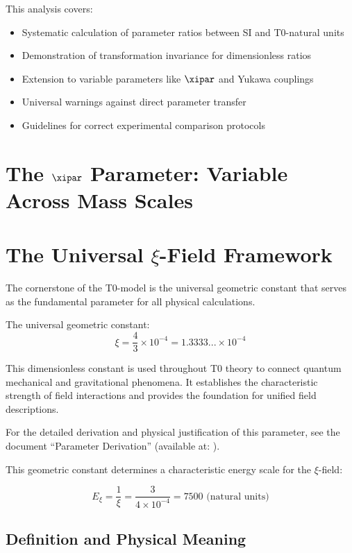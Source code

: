 	This analysis covers:
	\begin{itemize}
		\item Systematic calculation of parameter ratios between SI and T0-natural units
		\item Demonstration of transformation invariance for dimensionless ratios
		\item Extension to variable parameters like $\xipar$ and Yukawa couplings
		\item Universal warnings against direct parameter transfer
		\item Guidelines for correct experimental comparison protocols
	\end{itemize}
	
	\section{The $\xipar$ Parameter: Variable Across Mass Scales}
	\label{sec:xi_parameter}
	\section{The Universal $\xi$-Field Framework}
	
	The cornerstone of the T0-model is the universal geometric constant that serves as the fundamental parameter for all physical calculations.

		The universal geometric constant:
		\begin{equation}
			\xi = \frac{4}{3} \times 10^{-4} = 1.3333... \times 10^{-4}
		\end{equation}

	This dimensionless constant is used throughout T0 theory to connect quantum mechanical and gravitational phenomena. It establishes the characteristic strength of field interactions and provides the foundation for unified field descriptions.

		For the detailed derivation and physical justification of this parameter, see the document ``Parameter Derivation'' (available at: ).

	This geometric constant determines a characteristic energy scale for the $\xi$-field:
	
	\begin{equation}
		E_\xi = \frac{1}{\xi} = \frac{3}{4 \times 10^{-4}} = 7500 \text{ (natural units)}
	\end{equation}
	\subsection{Definition and Physical Meaning}
	\label{subsec:xi_definition}
	
